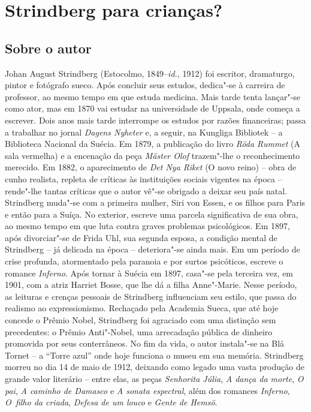 \chapter{Strindberg para crianças?}

\section{Sobre o autor}

Johan August Strindberg (Estocolmo, 1849--\textit{id.}, 1912) 
foi escritor, dramaturgo, pintor e fotógrafo sueco. Após concluir
seus estudos, dedica"-se à carreira de professor, ao mesmo tempo em que
estuda medicina. Mais tarde tenta lançar"-se como ator, mas em 1870 vai
estudar na universidade de Uppsala, onde começa a escrever. Dois anos
mais tarde interrompe os estudos por razões financeiras; passa a
trabalhar no jornal \textit{Dagens Nyheter} e, a seguir, na
Kungliga Bibliotek -- a Biblioteca Nacional da Suécia.
Em 1879, a publicação do livro \textit{Röda Rummet} (A sala vermelha) e
a encenação da peça \textit{Mäster Olof} trazem"-lhe o reconhecimento
merecido. Em 1882, o aparecimento de \textit{Det Nya Riket} (O novo
reino) -- obra de cunho realista, repleta de críticas às instituições
sociais vigentes na época -- rende"-lhe tantas críticas que o autor vê"-se
obrigado a deixar seu país natal. Strindberg muda"-se com a primeira
mulher, Siri von Essen, e os filhos para Paris e então para a Suíça. No
exterior, escreve uma parcela significativa de sua obra, ao mesmo tempo
em que luta contra graves problemas psicológicos. Em 1897, após
divorciar"-se de Frida Uhl, sua segunda esposa, a condição mental de
Strindberg -- já delicada na época -- deteriora"-se ainda mais. Em um
período de crise profunda, atormentado pela paranoia e por surtos
psicóticos, escreve o romance \textit{Inferno}. Após tornar à Suécia em
1897, casa"-se pela terceira vez, em 1901, com a atriz Harriet Bosse,
que lhe dá a filha Anne"-Marie. Nesse período, as leituras e crenças
pessoais de Strindberg influenciam seu estilo, que passa do realismo ao
expressionismo. Rechaçado pela Academia Sueca, que até 
hoje concede o Prêmio Nobel, Strindberg foi agraciado com uma 
distinção sem precedentes: o Prêmio Anti"-Nobel, uma arrecadação 
pública de dinheiro promovida por seus conterrâneos. 
No fim da vida, o autor instala"-se na Blå Tornet -- a “Torre azul” 
onde hoje funciona o museu em sua memória.
Strindberg morreu no dia 14 de maio de 1912, deixando como legado uma
vasta produção de grande valor literário -- entre elas, as peças
\textit{Senhorita Júlia}, \textit{A dança da morte}, \textit{O pai},
\textit{A caminho de Damasco} e \textit{A sonata espectral}, além dos
romances \textit{Inferno}, \textit{O~filho da criada}, \textit{Defesa
de um louco} e \textit{Gente de Hemsö}.

